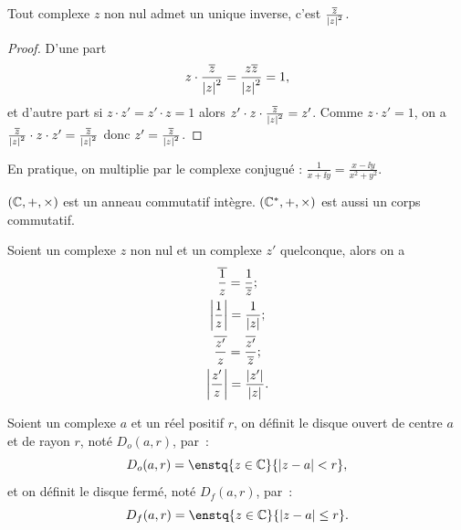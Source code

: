 %
\begin{prop}
  Tout complexe $z$ non nul admet un unique inverse, c'est $\frac{\overline{z}}{\left\lvert z\right\rvert^2}$.
\end{prop}
\begin{proof}
  D'une part
  \begin{equation}
    z \cdot \frac{\overline{z}}{\left\lvert z\right\rvert^2}=\frac{z \overline{z}}{\left\lvert z\right\rvert^2}=1,
  \end{equation}
  et d'autre part si $z\cdot z'=z'\cdot z=1$ alors $z'\cdot z\cdot \frac{\overline{z}}{\left\lvert z\right\rvert^2}=z'$. Comme $z\cdot z'=1$, on a $ \frac{\overline{z}}{\left\lvert z\right\rvert^2}\cdot z\cdot z'=\frac{\overline{z}}{\left\lvert z\right\rvert^2}$ donc $z'=\frac{\overline{z}}{\left\lvert z\right\rvert^2}$.
\end{proof}
En pratique, on multiplie par le complexe conjugué : $\frac{1}{x+\ii y}=\frac{x -\ii y}{x^2+y^2}$.
%
\begin{prop}
  $(\mathbb{C},+,\times)$ est un anneau commutatif intègre. $(\mathbb{C}^*,+,\times)$ est aussi un corps commutatif.
\end{prop}
%
\begin{prop}
  Soient un complexe $z$ non nul et un complexe $z'$ quelconque, alors on a 
  \begin{gather}
    \overline{\frac{1}{z}}=\frac{1}{\overline{z}}; \\ 
    \left\lvert\frac{1}{z}\right\rvert=\frac{1}{\left\lvert z\right\rvert}; \\ 
    \overline{\frac{z'}{z}} = \frac{\overline{z'}}{\overline{z}};\\ 
    \left\lvert\frac{z'}{z}\right\rvert=\frac{\left\lvert z'\right\rvert}{\left\lvert z\right\rvert}.
  \end{gather}
\end{prop}
%
\begin{defdef}
  Soient un complexe $a$ et un réel positif $r$, on définit le disque ouvert de centre $a$ et de rayon $r$, noté $D_o(a,r)$, par~:
  \begin{equation}
    D_o(a,r)=\enstq{z\in\C}{\abs{z-a}<r},
  \end{equation}
  et on définit le disque fermé, noté $D_f(a,r)$, par~:
  \begin{equation}
    D_f(a,r)=\enstq{z\in\C}{\abs{z-a}\leq r}.
  \end{equation}
\end{defdef}
%
